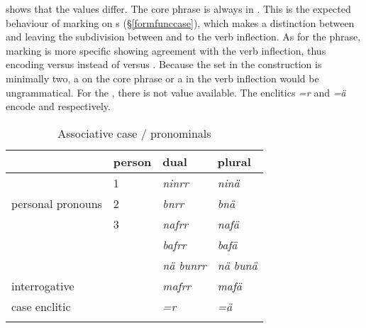  shows that the  values differ. The core phrase is always in . This is the expected behaviour of  marking on s (\S\ref{formfunccase}), which makes a distinction between  and  leaving the subdivision between  and  to the verb inflection. As for the  phrase,  marking is more specific showing agreement with the verb inflection, thus encoding  versus  instead of  versus . Because the set in the  construction is minimally two, a  on the core phrase or a  in the verb inflection would be ungrammatical. For the  , there is not   value available. The enclitics \emph{=r} and \emph{=ä} encode  and  respectively.

\begin{table}
\caption{Associative case / pronominals}
\label{comcase-table}
	\begin{tabularx}{.8\textwidth}{XXXl}
		\lsptoprule
		& {person} & {dual} & {plural} \\\midrule
		\multirow{3}{3cm}{personal pronouns} &1 &\emph{ninrr} &\emph{ninä}\\
		&2 &\emph{bnrr} &\emph{bnä}\\
		&3 &\emph{nafrr} &\emph{nafä}\\
		\Recog&&\emph{bafrr}&\emph{bafä}\\
		\Indf&&\emph{nä bunrr}&\emph{nä bunä}\\
		interrogative&&\emph{mafrr}&\emph{mafä}\\
		case enclitic&&\emph{=r}&\emph{=ä}\\
		\lspbottomrule
	\end{tabularx}
\end{table}%

